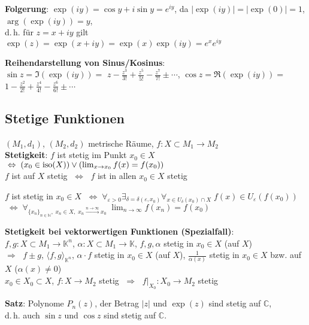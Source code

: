 \textbf{Folgerung}: $\exp(iy) = \cos y + i \sin y = e^{iy}$, da
$|\exp(iy)| = |\exp(0)| = 1$, $\arg(\exp(iy)) = y$, \\
d.\,h. für $z = x + iy$ gilt
$\exp(z) = \exp(x + iy) = \exp(x) \exp(iy) = e^x e^{iy}$

\textbf{Reihendarstellung von Sinus/Kosinus}: \\
$\sin z = \Im(\exp(iy)) =$ {\large $z - \frac{z^3}{3!} + \frac{z^5}{5!} -
\frac{z^7}{7!} \pm \cdots$}, \quad
$\cos z = \Re(\exp(iy)) =$ {\large $1 - \frac{z^2}{2!} + \frac{z^4}{4!} -
\frac{z^6}{6!} \pm \cdots$}

\subsection{%
    Stetige Funktionen%
}

$(M_1,d_1)$, $(M_2,d_2)$ metrische Räume, $f: X \subset M_1 \rightarrow M_2$ \\
\textbf{Stetigkeit}: $f$ ist stetig im Punkt $x_0 \in X$
$\;\Leftrightarrow\; (x_0 \in \operatorname{iso}(X)) \lor (\lim_{x \to x_0} f(x) = f(x_0))$
\\
$f$ ist auf $X$ stetig $\;\Leftrightarrow\;$
$f$ ist in allen $x_0 \in X$ stetig

\pagebreak

$f$ ist stetig in $x_0 \in X$
$\;\Leftrightarrow\; \forall_{\varepsilon > 0}
\exists_{\delta = \delta(\varepsilon, x_0)}
\forall_{x \in U_\delta(x_0) \cap X}\; f(x) \in U_\varepsilon(f(x_0))$ \\
$\;\Leftrightarrow\; \forall_{\{x_n\}_{n \in \mathbb{N}},\; x_n \in X,\;
x_n \xrightarrow{n \to \infty} x_0}\;
\lim_{n \to \infty} f(x_n) = f(x_0)$

\textbf{Stetigkeit bei vektorwertigen Funktionen (Spezialfall)}: \\
$f, g: X \subset M_1 \rightarrow \mathbb{K}^n$,
$\alpha: X \subset M_1 \rightarrow \mathbb{K}$, $f, g, \alpha$ stetig
in $x_0 \in X$ (auf $X$) \\
$\Rightarrow\;$
$f \pm g$, $\langle f, g \rangle_{\mathbb{K}^n}$, $\alpha \cdot f$ stetig
in $x_0 \in X$ (auf $X$),
$\frac{1}{\alpha(x)}$ stetig in $x_0 \in X$ bzw. auf $X$ ($\alpha(x) \not= 0$)
\\
$x_0 \in X_0 \subset X$, $f: X \rightarrow M_2$ stetig
$\;\Rightarrow\;$ $f|_{X_0}: X_0 \rightarrow M_2$ stetig

\textbf{Satz}: Polynome $P_n(z)$, der Betrag $|z|$ und $\exp(z)$ sind stetig
auf $\mathbb{C}$, \\
d.\,h. auch $\sin z$ und $\cos z$ sind stetig auf $\mathbb{C}$.

